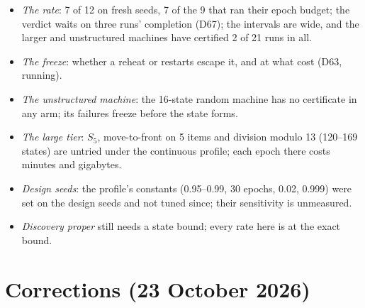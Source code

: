\documentclass[11pt]{article}
\begin{document}
\begin{itemize}
  \item \emph{The rate}: 7 of 12 on fresh seeds, 7 of the 9 that ran their epoch budget; the verdict
  waits on three runs' completion (D67); the intervals are wide, and the larger and unstructured machines have certified 2 of 21 runs in all.
  \item \emph{The freeze}: whether a reheat or restarts escape it, and at what cost (D63, running).
  \item \emph{The unstructured machine}: the 16-state random machine has no certificate in any arm;
  its failures freeze before the state forms.
  \item \emph{The large tier}: $S_5$, move-to-front on 5 items and division modulo 13 (120--169
  states) are untried under the continuous profile; each epoch there costs minutes and gigabytes.
  \item \emph{Design seeds}: the profile's constants (0.95--0.99, 30 epochs, 0.02, 0.999) were set
  on the design seeds and not tuned since; their sensitivity is unmeasured.
  \item \emph{Discovery proper} still needs a state bound; every rate here is at the exact bound.
\end{itemize}

\section{Corrections (23 October 2026)}
\label{sec:corrections}
\end{document}
